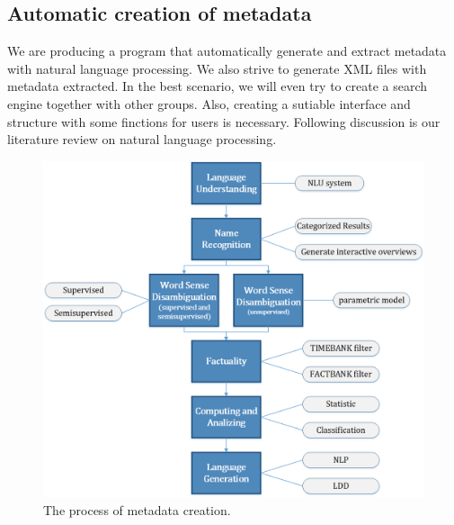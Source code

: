 
\subsection{Automatic creation of metadata}



We are producing a program that automatically generate and extract metadata with natural language processing. 
We also strive to generate XML files with metadata extracted. 
In the best scenario, we will even try to create a search engine together with other groups. 
Also, creating a sutiable interface and structure with some finctions for users is necessary. 
Following discussion is our literature review on natural language processing.

\begin{figure}[ht]
	\begin{center}
		\includegraphics[width=1.8\columnwidth]{Union_Background_Chart_1}
	\end{center}
	\caption{The process of metadata creation.}
\end{figure}

